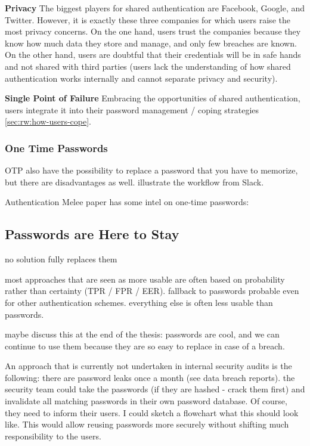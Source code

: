 \textbf{Privacy} The biggest players for shared authentication are Facebook, Google, and Twitter. However, it is exactly these three companies for which users raise the most privacy concerns. On the one hand, users trust the companies because they know how much data they store and manage, and only few breaches are known. On the other hand, users are doubtful that their credentials will be in safe hands and not shared with third parties (users lack the understanding of how shared authentication works internally and cannot separate privacy and security). 

\textbf{Single Point of Failure} Embracing the opportunities of shared authentication, users integrate it into their password management / coping strategies \ref{sec:rw:how-users-cope}. 

	
\subsubsection{One Time Passwords}

OTP also have the possibility to replace a password that you have to memorize, but there are disadvantages as well. 
illustrate the workflow from Slack.

Authentication Melee paper has some intel on one-time passwords: \cite{Ruoti2015AuthenticationMelee}


\subsection{Passwords are Here to Stay}
no solution fully replaces them

most approaches that are seen as more usable are often based on probability rather than certainty (TPR / FPR / EER). fallback to passwords probable even for other authentication schemes. everything else is often less usable than passwords. 

maybe discuss this at the end of the thesis: passwords are cool, and we can continue to use them because they are so easy to replace in case of a breach. 

An approach that is currently not undertaken in internal security audits is the following: there are password leaks once a month (see data breach reports). the security team could take the passwords (if they are hashed - crack them first) and invalidate all matching passwords in their own password database. Of course, they need to inform their users. I could sketch a flowchart what this should look like. This would allow reusing passwords more securely without shifting much responsibility to the users. 

